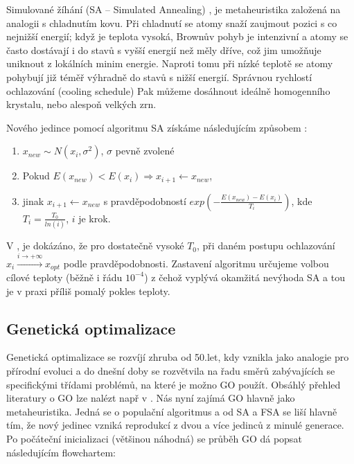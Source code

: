 Simulované žíhání (SA -- Simulated Annealing) \cite{SA Hajek}, \cite{SA Tsitsiklis} je metaheuristika založená na analogii s chladnutím kovu. Při chladnutí se atomy snaží zaujmout pozici s co nejnižší energií; když je teplota vysoká, Brownův pohyb je intenzivní a atomy se často dostávají i do stavů s vyšší energií než měly dříve, což jim umožňuje uniknout z lokálních minim energie. Naproti tomu při nízké teplotě se atomy pohybují již téměř výhradně do stavů s nižší energií. Správnou rychlostí ochlazování (cooling schedule) Pak můžeme dosáhnout ideálně homogenního krystalu, nebo alespoň velkých zrn.

Nového jedince pomocí algoritmu SA získáme následujícím způsobem \cite[p.~1153]{SA survey}:
\begin{enumerate}
  \item $x_{new} \sim N(x_i, \sigma^2)$, $\sigma$ pevně zvolené
  \item Pokud $E(x_{new}) < E(x_i) \Rightarrow x_{i+1} \leftarrow x_{new}$,
  \item jinak $x_{i+1} \leftarrow x_{new}$ s pravděpodobností $exp(-\frac{E(x_{new}) - E(x_i)}{T_i})$,
    \newline kde $T_i = \frac{T_0}{ln(i)}$, $i$ je krok.
\end{enumerate}


V \cite{SA Hajek}, \cite{SA Tsitsiklis} je dokázáno, že pro dostatečně vysoké $T_0$, při daném postupu ochlazování $x_i \xrightarrow{i \to +\infty} x_{opt}$ podle pravděpodobnosti. Zastavení algoritmu určujeme volbou cílové teploty (běžně i řádu $10^{-4}$) z čehož vyplývá okamžitá nevýhoda SA a tou je v praxi příliš pomalý pokles teploty.


\subsection{Genetická optimalizace }

Genetická optimalizace se rozvíjí zhruba od 50.let, kdy vznikla jako analogie pro přírodní evoluci a do dnešní doby se rozvětvila na řadu směrů zabývajících se specifickými třídami problémů, na které je možno GO použít. Obsáhlý přehled literatury o GO lze nalézt např v \cite[p.~]{GO ebook}. Nás nyní zajímá GO hlavně jako metaheuristika. Jedná se o populační algoritmus a od SA a FSA se liší hlavně tím, že nový jedinec vzniká reprodukcí z dvou a více jedinců z minulé generace. Po počáteční inicializaci (většinou náhodná) se průběh GO dá popsat následujícím flowchartem:

